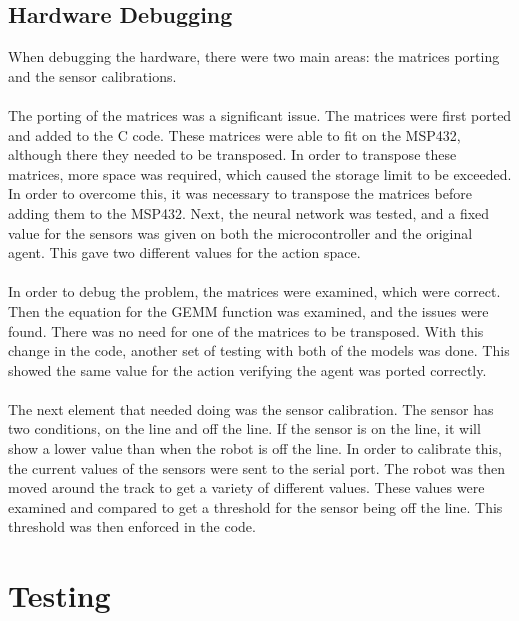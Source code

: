 \documentclass[a4paper,12pt]{article}
\begin{document}
\subsection{Hardware Debugging}
When debugging the hardware, there were two main areas: the matrices porting and the sensor calibrations. 
\\\\
The porting of the matrices was a significant issue. The matrices were first ported and added to the C code. These matrices were able to fit on the MSP432, although there they needed to be transposed. In order to transpose these matrices, more space was required, which caused the storage limit to be exceeded. In order to overcome this, it was necessary to transpose the matrices before adding them to the MSP432. Next, the neural network was tested, and a fixed value for the sensors was given on both the microcontroller and the original agent. This gave two different values for the action space. 
\\\\
In order to debug the problem, the matrices were examined, which were correct. Then the equation for the GEMM function was examined, and the issues were found. There was no need for one of the matrices to be transposed. With this change in the code, another set of testing with both of the models was done. This showed the same value for the action verifying the agent was ported correctly. 
\\\\
The next element that needed doing was the sensor calibration. The sensor has two conditions, on the line and off the line. If the sensor is on the line, it will show a lower value than when the robot is off the line. In order to calibrate this, the current values of the sensors were sent to the serial port. The robot was then moved around the track to get a variety of different values. These values were examined and compared to get a threshold for the sensor being off the line. This threshold was then enforced in the code. 

\section{Testing}
\end{document}
